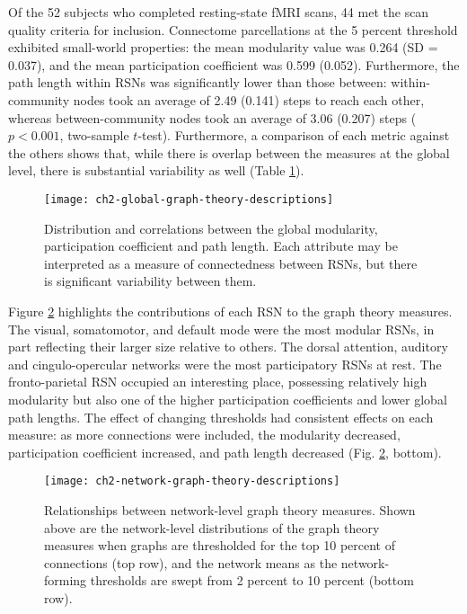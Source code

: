 Of the 52 subjects who completed resting-state fMRI scans, 44 met the scan quality criteria for inclusion. Connectome parcellations at the 5 percent threshold exhibited small-world properties: the mean modularity value was 0.264 (SD = 0.037), and the mean participation coefficient was 0.599 (0.052). Furthermore, the path length within RSNs was significantly lower than those between: within-community nodes took an average of 2.49 (0.141) steps to reach each other, whereas between-community nodes took an average of 3.06 (0.207) steps ($p < 0.001$, two-sample $t$-test). Furthermore, a comparison of each metric against the others shows that, while there is overlap between the measures at the global level, there is substantial variability as well (Table \ref{fig:ch2-global-graph-theory-descriptions}).

\begin{figure}[t]
    \centering
    \texttt{[image: ch2-global-graph-theory-descriptions]}
    \caption[Distribution and correlations between global graph theory measures.]{Distribution and correlations between the global modularity, participation coefficient and path length. Each attribute may be interpreted as a measure of connectedness between RSNs, but there is significant variability between them.}
    \label{fig:ch2-global-graph-theory-descriptions}
\end{figure}

Figure \ref{fig:ch2-network-graph-theory-descriptions} highlights the contributions of each RSN to the graph theory measures. The visual, somatomotor, and default mode were the most modular RSNs, in part reflecting their larger size relative to others. The dorsal attention, auditory and cingulo-opercular networks were the most participatory RSNs at rest. The fronto-parietal RSN occupied an interesting place, possessing relatively high modularity but also one of the higher participation coefficients and lower global path lengths. The effect of changing thresholds had consistent effects on each measure: as more connections were included, the modularity decreased, participation coefficient increased, and path length decreased (Fig.  \ref{fig:ch2-network-graph-theory-descriptions}, bottom). 

\begin{figure}[t]
    \centering
    \texttt{[image: ch2-network-graph-theory-descriptions]}
    \caption[Relationships between network-level graph theory measures.]{Relationships between network-level graph theory measures. Shown above are the network-level distributions of the graph theory measures when graphs are thresholded for the top 10 percent of connections (top row), and the network means as the network-forming thresholds are swept from 2 percent to 10 percent (bottom row).}
    \label{fig:ch2-network-graph-theory-descriptions}
\end{figure}

